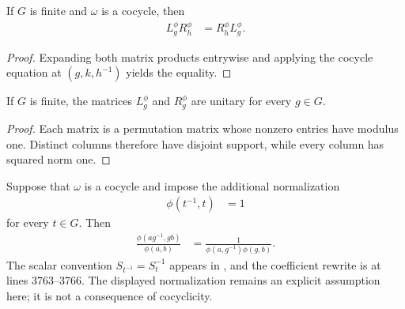 \begin{lemma}
    \label{thm:mpug_twisted_regular_commutation}
    \leanok
    If $G$ is finite and $\omega$ is a cocycle, then
    \begin{align}
        L_g^\phi R_h^\phi
         & =R_h^\phi L_g^\phi.
        \label{eq:mpug_twisted_regular_commutation}
    \end{align}
\end{lemma}

\begin{proof}\leanok
    Expanding both matrix products entrywise and applying the cocycle equation
    at $(g,k,h^{-1})$ yields the equality.
\end{proof}

\begin{lemma}
    \label{thm:mpug_twisted_regular_unitary}
    \leanok
    If $G$ is finite, the matrices $L_g^\phi$ and $R_g^\phi$ are unitary for
    every $g\in G$.
\end{lemma}

\begin{proof}\leanok
    Each matrix is a permutation matrix whose nonzero entries have modulus
    one.  Distinct columns therefore have disjoint support, while every column
    has squared norm one.
\end{proof}

\begin{lemma}
    \label{thm:mpug_onsite_gauss_phase}
    \leanok
    Suppose that $\omega$ is a cocycle and impose the additional normalization
    \begin{align}
        \phi(t^{-1},t) & =1
    \end{align}
    for every $t\in G$.  Then
    \begin{align}
        \frac{\phi(ag^{-1},gb)}{\phi(a,b)}
         & =\frac{1}{\phi(a,g^{-1})\phi(g,b)}.
        \label{eq:mpug_onsite_gauss_phase}
    \end{align}
    The scalar convention $S_{t^{-1}}=S_t^{-1}$ appears in
    \cite[line~238]{FrancoRubio2025MPUGauging}, and the coefficient rewrite is
    at lines 3763--3766. The displayed normalization remains an explicit
    assumption here; it is not a consequence of cocyclicity.
\end{lemma}

